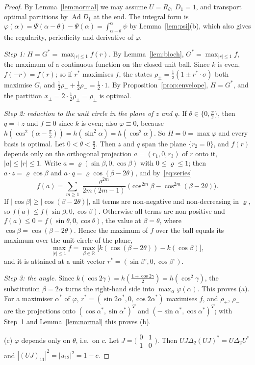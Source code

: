\documentclass[11pt]{article}
\DeclareMathOperator{\Ad}{Ad}
\newcommand{\R}{\mathbb{R}}
\theoremstyle{plain}
\theoremstyle{definition}
\theoremstyle{remark}
\begin{document}
\begin{proof}
By Lemma~\ref{lem:normal} we may assume $U=R_\theta$, $D_1=1$, and transport optimal partitions by $\Ad D_1$ at the end.
The integral form is $\varphi(\alpha)=\Psi(\alpha-\theta)-\Psi(\alpha)=\int_{\alpha-\theta}^\alpha\psi$ by Lemma~\ref{lem:psi}(b), which
also gives the regularity, periodicity and derivative of $\varphi$.

\emph{Step 1: $H=G^*=\max_{|r|\le1}f(r)$.} By Lemma~\ref{lem:bloch}, $G^*=\max_{|r|\le1}f$, the maximum of a continuous function on
the closed unit ball. Since $k$ is even, $f(-r)=f(r)$; so if $r^*$ maximises $f$, the states $\rho_\pm=\frac12(1\pm r^*\cdot\sigma)$
both maximise $G$, and $\frac12\rho_++\frac12\rho_-=\frac12\cdot1$. By Proposition~\ref{prop:envelope}, $H=G^*$, and the partition
$x_\pm=2\cdot\frac12\rho_\pm=\rho_\pm$ is optimal.

\emph{Step 2: reduction to the unit circle in the plane of $z$ and $q$.} If $\theta\in\{0,\frac\pi2\}$, then $q=\pm z$ and $f\equiv0$
since $k$ is even; also $\varphi\equiv0$, because $h(\cos^2(\alpha-\frac\pi2))=h(\sin^2\alpha)=h(\cos^2\alpha)$. So $H=0=\max\varphi$
and every basis is optimal. Let $0<\theta<\frac\pi2$. Then $z$ and $q$ span the plane $\{r_2=0\}$, and $f(r)$ depends only on
the orthogonal projection $a=(r_1,0,r_3)$ of $r$ onto it, $|a|\le|r|\le1$. Write $a=\varrho(\sin\beta,0,\cos\beta)$ with
$0\le\varrho\le1$; then $a\cdot z=\varrho\cos\beta$ and $a\cdot q=\varrho\cos(\beta-2\theta)$, and by~\eqref{eq:series}
\[
  f(a)=\sum_{m\ge1}\frac{\varrho^{2m}}{2m(2m-1)}\bigl(\cos^{2m}\beta-\cos^{2m}(\beta-2\theta)\bigr).
\]
If $|\cos\beta|\ge|\cos(\beta-2\theta)|$, all terms are non-negative and non-decreasing in $\varrho$, so
$f(a)\le f(\sin\beta,0,\cos\beta)$. Otherwise all terms are non-positive and $f(a)\le0=f(\sin\theta,0,\cos\theta)$, the
value at $\beta=\theta$, where $\cos\beta=\cos(\beta-2\theta)$. Hence the maximum of $f$ over the ball equals its maximum over the
unit circle of the plane,
\[
  \max_{|r|\le1}f=\max_{\beta\in\R}\bigl[k(\cos(\beta-2\theta))-k(\cos\beta)\bigr],
\]
and it is attained at a unit vector $r^*=(\sin\beta^\circ,0,\cos\beta^\circ)$.

\emph{Step 3: the angle.} Since $k(\cos2\gamma)=h(\frac{1+\cos2\gamma}2)=h(\cos^2\gamma)$, the substitution $\beta=2\alpha$ turns
the right-hand side into $\max_\alpha\varphi(\alpha)$. This proves (a). For a maximiser $\alpha^*$ of $\varphi$, $r^*=(\sin2\alpha^*,0,
\cos2\alpha^*)$ maximises $f$, and $\rho_+$, $\rho_-$ are the projections onto $(\cos\alpha^*,\sin\alpha^*)^T$ and
$(-\sin\alpha^*,\cos\alpha^*)^T$; with Step~1 and Lemma~\ref{lem:normal} this proves (b).

(c) $\varphi$ depends only on $\theta$, i.e.\ on $c$. Let $J=\bigl(\begin{smallmatrix}0&1\\1&0\end{smallmatrix}\bigr)$. Then
$UJ\Delta_2(UJ)^*=U\Delta_2U^*$ and $|(UJ)_{11}|^2=|u_{12}|^2=1-c$.
\end{proof}
\end{document}
